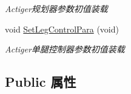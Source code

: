 \begin{DoxyCompactItemize}
\begin{DoxyCompactList}\small\item\em Actiger规划器参数初值装载 \end{DoxyCompactList}\item 
\mbox{\label{classquadruped_1_1Parameters_a306cfab3a1c07ecf142e03374b458bda}} 
void \hyperlink{classquadruped_1_1Parameters_a306cfab3a1c07ecf142e03374b458bda}{Set\+Leg\+Control\+Para} (void)
\begin{DoxyCompactList}\small\item\em Actiger单腿控制器参数初值装载 \end{DoxyCompactList}\end{DoxyCompactItemize}
\subsection*{Public 属性}
